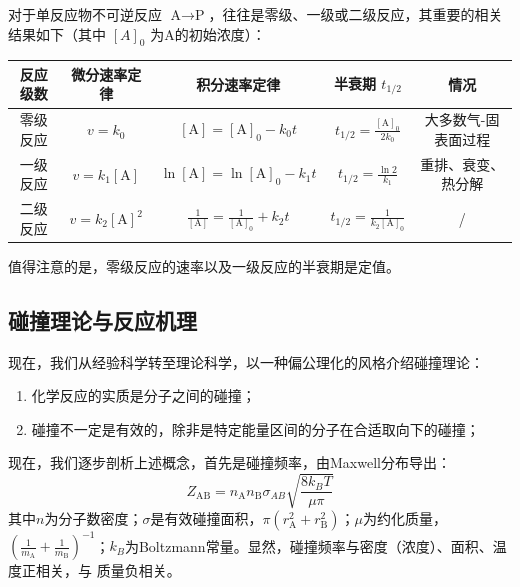 \begin{proposition}[零级、一级和二级反应的动力学特征]
对于单反应物不可逆反应 $\text{A} \rightarrow \text{P}$，往往是零级、一级或二级反应，其重要的相关结果如下（其中 $[A]_0$ 为A的初始浓度）：
   
\begin{center}
\begin{tabular}{c c c c c}
    \toprule
    反应级数 & 微分速率定律 & 积分速率定律 & 半衰期 \(t_{1/2}\) & 情况 \\
    \midrule
    零级反应 & \(v = k_0\) & \([\text{A}] = [\text{A}]_0 - k_0 t\) & \(t_{1/2} = \frac{[\text{A}]_0}{2k_0}\) & 大多数气-固表面过程 \\
    一级反应 & \(v = k_1 [\text{A}]\) & \(\ln[\text{A}] = \ln[\text{A}]_0 - k_1 t\) & \(t_{1/2} = \frac{\ln 2}{k_1}\) & 重排、衰变、热分解 \\
    二级反应 & \(v = k_2 [\text{A}]^2\) & \(\frac{1}{[\text{A}]} = \frac{1}{[\text{A}]_0} + k_2 t\) & \(t_{1/2} = \frac{1}{k_2 [\text{A}]_0}\) & / \\
    \bottomrule
\end{tabular}
\end{center}
值得注意的是，零级反应的速率以及一级反应的半衰期是定值。

\end{proposition}

\subsection{碰撞理论与反应机理}

现在，我们从经验科学转至理论科学，以一种偏公理化的风格介绍碰撞理论：

\begin{definition}[碰撞理论]
\begin{enumerate}
  \item 化学反应的实质是分子之间的碰撞；
  \item 碰撞不一定是有效的，除非是特定能量区间的分子在合适取向下的碰撞；
\end{enumerate}
\end{definition}

现在，我们逐步剖析上述概念，首先是碰撞频率，由Maxwell分布导出：$$Z_{\text{AB}} = n_{\text{A}} n_{\text{B}} \sigma_{AB}\sqrt{\frac{8 k_B T}{\mu \pi} }$$其中$n$为分子数密度；$\sigma$是有效碰撞面积，$\pi(r_{\text{A}}^2+r_{\text{B}}^2)$；$\mu$为约化质量，$(\frac{1}{m_{\text{A}}}+\frac{1}{m_{\text{B}}})^{-1}$；$k_B$为Boltzmann常量。显然，碰撞频率与密度（浓度）、面积、温度正相关，与 质量负相关。

